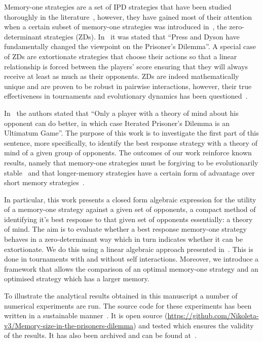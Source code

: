 \documentclass[10pt]{article}
\begin{document}
Memory-one strategies are a set of IPD strategies that have been
studied thoroughly in the literature~\cite{Nowak1990, Nowak1993}, however, they have gained
most of their attention when a certain subset of memory-one strategies was
introduced in~\cite{Press2012}, the zero-determinant strategies (ZDs). In~\cite{Stewart2012} it
was stated that ``Press and Dyson have fundamentally changed the viewpoint on
the Prisoner's Dilemma''.
A special case of ZDs are extortionate strategies that choose their actions so that a linear relationship is forced
between the players' score ensuring that they will always
receive at least as much as their opponents. ZDs are
indeed mathematically unique and are proven to be robust in pairwise
interactions, however, their true effectiveness in tournaments and
evolutionary dynamics has been questioned~\cite{adami2013, Hilbe2013b,
Hilbe2013, Hilbe2015, Knight2018, Harper2015}.

In~\cite{Press2012} the authors stated that ``Only a player with a theory of
mind about his opponent can do better, in which case Iterated Prisoner's Dilemma
is an Ultimatum Game''. The purpose of this work is to investigate the first
part of this sentence, more specifically, to identify the best response strategy
with a theory of mind of a given group of opponents. The outcomes of our work
reinforce known results, namely that memory-one strategies must be forgiving to
be evolutionarily stable~\cite{Stewart2013, Stewart2016} and that longer-memory
strategies have a certain form of advantage over short memory
strategies~\cite{Hilbe2017, Pan2015}.

In particular, this work presents a closed form algebraic expression for the utility
of a memory-one strategy against a given set of opponents, a compact method of
identifying it's best response to that given set of opponents essentially: a theory
of mind. The aim is
to evaluate whether a best response memory-one strategy behaves in a
zero-determinant way which in turn indicates whether it can be extortionate. We
do this using a linear algebraic approach presented in~\cite{Knight2019}.
This is done in tournaments with and without self interactions. Moreover, we
introduce a framework that allows the comparison of an optimal
memory-one strategy and an optimised strategy which has a larger memory.

To illustrate the analytical results obtained in this manuscript a number of
numerical experiments are run. The source code for these experiments has been
written in a sustainable manner~\cite{Benureau2018}.
It is open source (\url{https://github.com/Nikoleta-v3/Memory-size-in-the-prisoners-dilemma})
and tested which ensures the validity of the results. It has also been archived
and can be found at~\cite{nikoleta_glynatsi_2019}.
\end{document}
